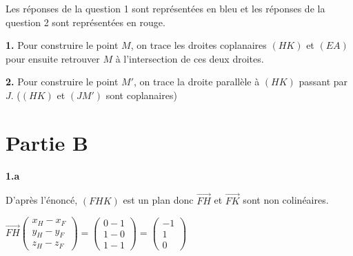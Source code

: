 \documentclass{article}
\begin{document}
\begin{figure}[hbt!]

\end{figure}

\noindent Les réponses de la question 1 sont représentées en bleu et les réponses de la question 2 sont représentées en rouge.

\textbf{1.} Pour construire le point $M$, on trace les droites coplanaires $(HK)$ et $(EA)$ pour ensuite retrouver $M$ à l'intersection de ces deux droites.

\textbf{2.} Pour construire le point $M'$, on trace la droite parallèle à $(HK)$ passant par $J$. ($(HK)$ et $(JM')$ sont coplanaires)

\vspace{2mm}

\section{Partie B}

\textbf{1.a}

\vspace{2mm}

\noindent D'après l'énoncé, $(FHK)$ est un plan donc $\overrightarrow{FH}$ et $\overrightarrow{FK}$ sont non colinéaires.

\vspace{2mm}

$\overrightarrow{FH}
\begin{pmatrix}
   x_H-x_F\\
   y_H-y_F\\
   z_H-z_F
\end{pmatrix}
=
\begin{pmatrix}
   0-1\\
   1-0\\
   1-1
\end{pmatrix}
= 
\begin{pmatrix}
   -1\\
   1\\
   0
\end{pmatrix}
$
\end{document}
